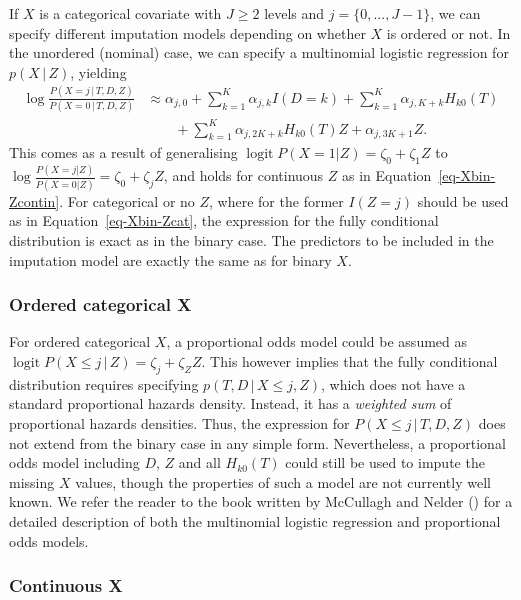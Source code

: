 \documentclass[
  letterpaper,
  paper=240mm:170mm,
  twoside=true,
  open=right,
  fontsize=10pt,
  pagesize=false,
  BCOR=15mm,
  DIV=14,
  headinclude=true,
  footinclude=false,
  headsepline=on]{scrbook}
\DeclareMathOperator{\logit}{logit}
\newcommand{\given}{\,|\,}
\begin{document}
If \(X\) is a categorical covariate with \(J \geq 2\) levels and
\(j = \{0,..., J-1\}\), we can specify different imputation models
depending on whether \(X\) is ordered or not. In the unordered (nominal)
case, we can specify a multinomial logistic regression for
\(p(X \given Z)\), yielding \[
\begin{aligned}
    \log \frac{P(X = j \given T,D,Z)}{P(X = 0\given T,D,Z)} &\approx \alpha_{j,0}  + \sum^K_{k = 1} \alpha_{j,k} I(D=k) + \sum^K_{k = 1} \alpha_{j,K + k} H_{k0}(T) \\
    &\qquad + \sum^K_{k = 1} \alpha_{j,2K + k} H_{k0}(T) Z  + \alpha_{j,3K + 1} Z.
\end{aligned}
\] This comes as a result of generalising
\(\logit P(X=1|Z) = \zeta_0 + \zeta_1 Z\) to
\(\log \frac{P(X=j|Z)}{P(X=0|Z)} = \zeta_0 + \zeta_j Z\), and holds for
continuous \(Z\) as in Equation~\ref{eq-Xbin-Zcontin}. For categorical
or no \(Z\), where for the former \(I(Z = j)\) should be used as in
Equation~\ref{eq-Xbin-Zcat}, the expression for the fully conditional
distribution is exact as in the binary case. The predictors to be
included in the imputation model are exactly the same as for binary
\(X\).

\subsubsection{Ordered categorical X}\label{ordered-categorical-x}

For ordered categorical \(X\), a proportional odds model could be
assumed as \(\logit P(X \leq j \given Z) = \zeta_{j} + \zeta_Z Z\). This
however implies that the fully conditional distribution requires
specifying \(p(T,D \given X \leq j, Z)\), which does not have a standard
proportional hazards density. Instead, it has a \emph{weighted sum} of
proportional hazards densities. Thus, the expression for
\(P(X \leq j \given T, D, Z)\) does not extend from the binary case in
any simple form. Nevertheless, a proportional odds model including
\(D\), \(Z\) and all \(H_{k0}(T)\) could still be used to impute the
missing \(X\) values, though the properties of such a model are not
currently well known. We refer the reader to the book written by
McCullagh and Nelder () for
a detailed description of both the multinomial logistic regression and
proportional odds models.

\subsubsection{Continuous X}\label{continuous-x}
\end{document}
